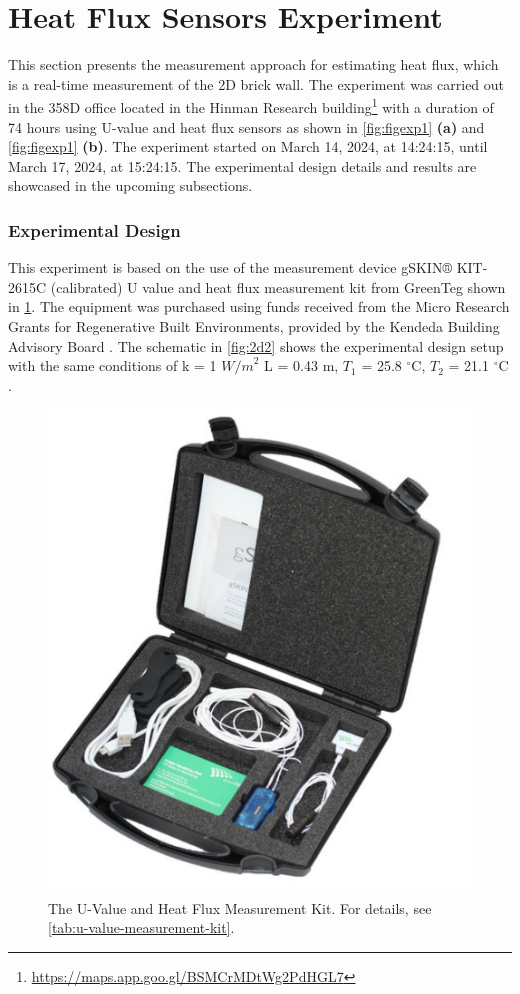 \section{Heat Flux Sensors Experiment}


This section presents the measurement approach for estimating heat flux, which is a real-time measurement of the 2D brick wall. The experiment was carried out in the 358D office located in the Hinman Research building\footnote{\url{https://maps.app.goo.gl/BSMCrMDtWg2PdHGL7}} with a duration of 74 hours using \gls{U}-value and heat flux sensors as shown in \ref{fig:figexp1} \textbf{(a)} and \ref{fig:figexp1} \textbf{(b)}. The experiment started on March 14, 2024, at 14:24:15, until March 17, 2024, at 15:24:15. 
The experimental design details and results are showcased in the upcoming subsections.





 
\subsubsection{Experimental Design}
 This experiment is based on the use of the measurement device gSKIN® KIT-2615C (calibrated) U value and heat flux measurement kit from GreenTeg \cite{greenteg} shown in \ref{fig:toolkit}. The equipment was purchased using funds received from the Micro Research Grants for Regenerative Built Environments, provided by the Kendeda Building Advisory Board \cite{kendeda}.
 The schematic in \cref{fig:2d2} shows the experimental design setup with the same conditions of k = 1 ${W/m}^2$ 
L = 0.43 m,
$T_1$ = 25.8 $^\circ \text{C}$, 
$T_2$  = 21.1  $^\circ \text{C}$.




\begin{figure}[tbh]
     \centering
    \includegraphics[width=0.5\linewidth]{Figures/greenteg.png}
     \caption[U-value measurement Kit]{The U-Value and Heat Flux Measurement Kit. For details, see \cref{tab:u-value-measurement-kit}.}
   \label{fig:toolkit}
 \end{figure}







